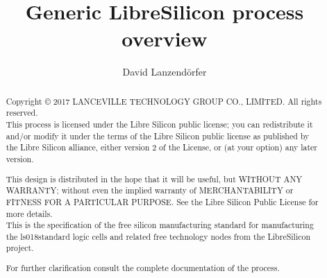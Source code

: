 \documentclass[10pt,a4paper,twoside]{article}
\author{David Lanzendörfer}
\title{Generic LibreSilicon process overview}
\begin{document}
\maketitle

\begin{abstract}
	Copyright © 2017 LANCEVILLE TECHNOLOGY GROUP CO., LIMITED. All rights reserved. \\

	This process is licensed under the Libre Silicon public license; you can redistribute it and/or modify it under the terms of the Libre Silicon public license
	as published by the Libre Silicon alliance, either version 2 of the License, or (at your option) any later version.

	This design is distributed in the hope that it will be useful, but WITHOUT ANY WARRANTY; without even the implied warranty of MERCHANTABILITY or FITNESS FOR A PARTICULAR PURPOSE.
	See the Libre Silicon Public License for more details. \\

	This is the specification of the free silicon manufacturing standard for manufacturing the ls018\footnotemark standard logic cells and related free technology nodes from the LibreSilicon project.
	
	For further clarification consult the complete documentation of the process.

\end{abstract}
\vfill
\newpage
\end{document}
